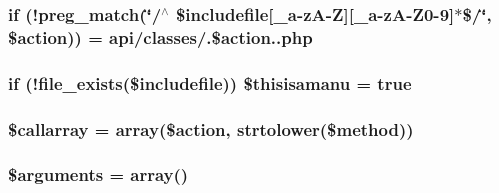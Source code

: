 \subsubsection[{\$includefile}]{\setlength{\rightskip}{0pt plus 5cm}if (!preg\+\_\+match(\char`\"{}/$^\wedge$ \$includefile\mbox{[}\+\_\+a-\/z\+A-\/Z\mbox{]}\mbox{[}\+\_\+a-\/z\+A-\/Z0-\/9\mbox{]}$\ast$\$/\char`\"{}, \$action)) = \textquotesingle{}api/classes/\textquotesingle{}.\$action.\textquotesingle{}.php\textquotesingle{}}\label{index_8php_a1c1b7d1432c2e06063bf8f9ad29ba19d}
\hypertarget{index_8php_a36df20dc9373bab32c6e4ff30b9093c3}{}
\subsubsection[{\$thisisamanu}]{\setlength{\rightskip}{0pt plus 5cm}if (!file\+\_\+exists(\$includefile)) \$thisisamanu = true}\label{index_8php_a36df20dc9373bab32c6e4ff30b9093c3}
\hypertarget{index_8php_a0a2d1b1b87dbb189b9243f333ad904f3}{}
\subsubsection[{\$callarray}]{\setlength{\rightskip}{0pt plus 5cm}\$callarray = array(\$action, strtolower(\$method))}\label{index_8php_a0a2d1b1b87dbb189b9243f333ad904f3}
\hypertarget{index_8php_a61eded163d962fc248b3cf209000979b}{}
\subsubsection[{\$arguments}]{\setlength{\rightskip}{0pt plus 5cm}\$arguments = array()}\label{index_8php_a61eded163d962fc248b3cf209000979b}
